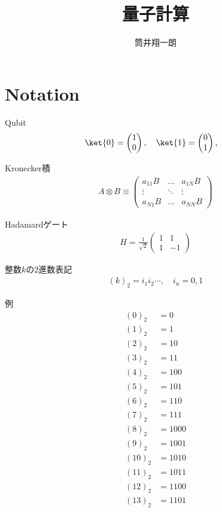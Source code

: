 \documentclass[]{ltjsarticle}
\begin{document}
\title{量子計算}


\author{筒井翔一朗}


\maketitle
\tableofcontents


\section{Notation}
Qubit
\begin{align}
    \ket{0} 
    = 
    \begin{pmatrix}
    1 \\ 0    
    \end{pmatrix}, \quad 
    \ket{1} 
    = 
    \begin{pmatrix}
    0 \\ 1    
    \end{pmatrix}, \quad 
\end{align}

Kronecker積
\begin{align}
    A \otimes B 
    \equiv
    \begin{pmatrix}
        a_{11}B & \dots & a_{1N}B \\
        \vdots & \ddots & \vdots \\
        a_{N1}B & \dots & a_{NN}B
    \end{pmatrix}
\end{align}

Hadamardゲート
\begin{align}
    H 
    = 
    \frac{1}{\sqrt{2}}
    \begin{pmatrix}
        1 & 1 \\
        1 & -1
    \end{pmatrix}
\end{align}

整数$k$の2進数表記
\begin{align}
    (k)_2 = i_1 i_2 \cdots, \quad i_n = 0, 1
\end{align}

例
\begin{align}
    (0)_2 &= 0 \\
    (1)_2 &= 1 \\
    (2)_2 &= 10 \\
    (3)_2 &= 11 \\
    (4)_2 &= 100 \\
    (5)_2 &= 101 \\
    (6)_2 &= 110 \\
    (7)_2 &= 111 \\
    (8)_2 &= 1000 \\
    (9)_2 &= 1001 \\
    (10)_2 &= 1010 \\
    (11)_2 &= 1011 \\
    (12)_2 &= 1100 \\
    (13)_2 &= 1101
\end{align}
\end{document}
